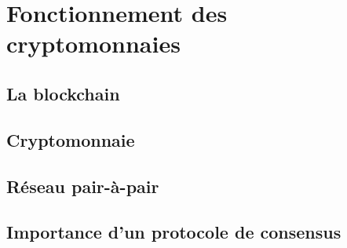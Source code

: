 \chapter{Fonctionnement des cryptomonnaies}
\label{ch:presentation}

\section{La blockchain}

\section{Cryptomonnaie}

\section{Réseau pair-à-pair}

\section{Importance d'un protocole de consensus}